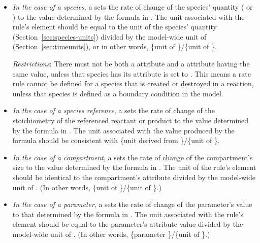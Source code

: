 \begin{itemize}
  
\item \emph{In the case of a species}, a \RateRule sets the rate
  of change of the species' quantity ( or
  ) to the value determined by the formula in
  .  The unit associated with the rule's 
  element should be equal to the unit of the species' quantity
  (Section~\ref{sec:species-units}) divided by the model-wide unit
  of  (Section~\ref{sec:timeunits}), or in other
  words, \{unit of \}/\{unit of
  \}.

  \emph{Restrictions}: There must not be both a \RateRule
   attribute and a \SpeciesReference {}
  attribute having the same value, unless that species has its
   attribute is set to .  This
  means a rate rule cannot be defined for a species that is
  created or destroyed in a reaction, unless that species is
  defined as a boundary condition in the model.

\item \emph{In the case of a species reference}, a \RateRule sets
  the rate of change of the stoichiometry of the referenced
  reactant or product to the value determined by the formula in
  .  The unit associated with the value produced by
  the formula should be consistent with \{unit derived from
  \}/\{unit of \}.
  
\item \emph{In the case of a compartment}, a \RateRule sets the
  rate of change of the compartment's size to the value determined
  by the formula in .  The unit of the rule's
   element should be identical to the compartment's
   attribute divided by the model-wide unit of
  .  (In other words, \{unit of
  \}/\{unit of \}.)

\item \emph{In the case of a parameter}, a \RateRule sets the rate
  of change of the parameter's value to that determined by the
  formula in .  The unit associated with the rule's
   element should be equal to the parameter's
   attribute value divided by the model-wide unit of
  .  (In other words, \{parameter
  \}/\{unit of \}.)

\end{itemize}

